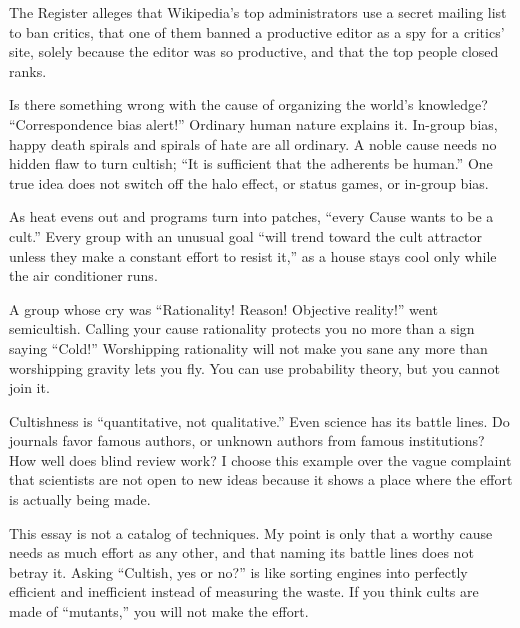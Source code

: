 
The Register alleges that Wikipedia's top administrators use a secret mailing list to ban critics, that one of them banned a productive editor as a spy for a critics' site, solely because the editor was so productive, and that the top people closed ranks. 

Is there something wrong with the cause of organizing the world's knowledge? ``Correspondence bias alert!'' Ordinary human nature explains it. In-group bias, happy death spirals and spirals of hate are all ordinary. A noble cause needs no hidden flaw to turn cultish; ``It is sufficient that the adherents be human.'' One true idea does not switch off the halo effect, or status games, or in-group bias.

As heat evens out and programs turn into patches, ``every Cause wants to be a cult.'' Every group with an unusual goal ``will trend toward the cult attractor unless they make a constant effort to resist it,'' as a house stays cool only while the air conditioner runs. 

A group whose cry was ``Rationality! Reason! Objective reality!'' went semicultish. Calling your cause rationality protects you no more than a sign saying ``Cold!'' Worshipping rationality will not make you sane any more than worshipping gravity lets you fly. You can use probability theory, but you cannot join it.

Cultishness is ``quantitative, not qualitative.'' Even science has its battle lines. Do journals favor famous authors, or unknown authors from famous institutions? How well does blind review work? I choose this example over the vague complaint that scientists are not open to new ideas because it shows a place where the effort is actually being made. 

This essay is not a catalog of techniques. My point is only that a worthy cause needs as much effort as any other, and that naming its battle lines does not betray it. Asking ``Cultish, yes or no?'' is like sorting engines into perfectly efficient and inefficient instead of measuring the waste. If you think cults are made of ``mutants,'' you will not make the effort.
